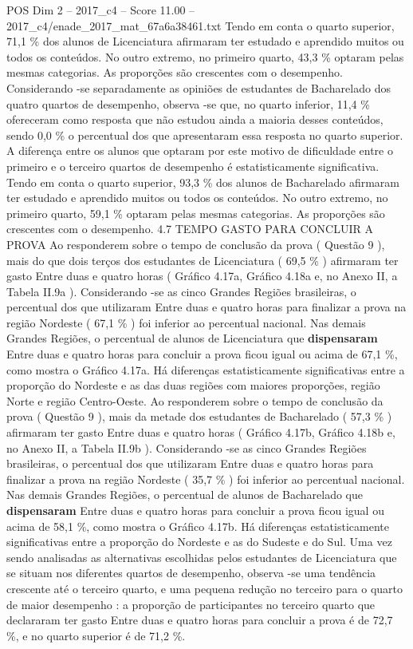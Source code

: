 \begin{textsample}{POS Dim 2 – 2017\_c4 – Score 11.00 – 2017\_c4/enade\_2017\_mat\_67a6a38461.txt}
Tendo em conta o quarto superior, 71,1 \% dos alunos de Licenciatura afirmaram ter estudado e aprendido muitos ou todos os conteúdos.
No outro extremo, no primeiro quarto, 43,3 \% optaram pelas mesmas categorias.
As proporções são crescentes com o desempenho.
Considerando -se separadamente as opiniões de estudantes de Bacharelado dos quatro quartos de desempenho, observa -se que, no quarto inferior, 11,4 \% ofereceram como resposta que não estudou ainda a maioria desses conteúdos, sendo 0,0 \% o percentual dos que apresentaram essa resposta no quarto superior.
A diferença entre os alunos que optaram por este motivo de dificuldade entre o primeiro e o terceiro quartos de desempenho é estatisticamente significativa.
Tendo em conta o quarto superior, 93,3 \% dos alunos de Bacharelado afirmaram ter estudado e aprendido muitos ou todos os conteúdos.
No outro extremo, no primeiro quarto, 59,1 \% optaram pelas mesmas categorias.
As proporções são crescentes com o desempenho. 4.7 TEMPO GASTO PARA CONCLUIR A PROVA Ao responderem sobre o tempo de conclusão da prova ( Questão 9 ), mais do que dois terços dos estudantes de Licenciatura ( 69,5 \% ) afirmaram ter gasto Entre duas e quatro horas ( Gráfico 4.17a, Gráfico 4.18a e, no Anexo II, a Tabela II.9a ).
Considerando -se as cinco Grandes Regiões brasileiras, o percentual dos que utilizaram Entre duas e quatro horas para finalizar a prova na região Nordeste ( 67,1 \% ) foi inferior ao percentual nacional.
Nas demais Grandes Regiões, o percentual de alunos de Licenciatura que \textbf{dispensaram} Entre duas e quatro horas para concluir a prova ficou igual ou acima de 67,1 \%, como mostra o Gráfico 4.17a.
Há diferenças estatisticamente significativas entre a proporção do Nordeste e as das duas regiões com maiores proporções, região Norte e região Centro-Oeste.
Ao responderem sobre o tempo de conclusão da prova ( Questão 9 ), mais da metade dos estudantes de Bacharelado ( 57,3 \% ) afirmaram ter gasto Entre duas e quatro horas ( Gráfico 4.17b, Gráfico 4.18b e, no Anexo II, a Tabela II.9b ).
Considerando -se as cinco Grandes Regiões brasileiras, o percentual dos que utilizaram Entre duas e quatro horas para finalizar a prova na região Nordeste ( 35,7 \% ) foi inferior ao percentual nacional.
Nas demais Grandes Regiões, o percentual de alunos de Bacharelado que \textbf{dispensaram} Entre duas e quatro horas para concluir a prova ficou igual ou acima de 58,1 \%, como mostra o Gráfico 4.17b.
Há diferenças estatisticamente significativas entre a proporção do Nordeste e as do Sudeste e do Sul.
Uma vez sendo analisadas as alternativas escolhidas pelos estudantes de Licenciatura que se situam nos diferentes quartos de desempenho, observa -se uma tendência crescente até o terceiro quarto, e uma pequena redução no terceiro para o quarto de maior desempenho : a proporção de participantes no terceiro quarto que declararam ter gasto Entre duas e quatro horas para concluir a prova é de 72,7 \%, e no quarto superior é de 71,2 \%.

\end{textsample}
